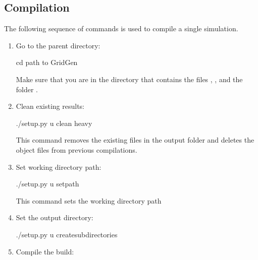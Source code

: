\documentclass[letterpaper,10pt,english]{sphinxmanual}
\begin{document}
\subsection{Compilation}
\label{\detokenize{setup:compilation}}\label{\detokenize{setup:id2}}
The following sequence of commands is used to compile a single simulation.
\begin{enumerate}
\item {} 
Go to the parent directory:

\begin{sphinxVerbatim}[commandchars=\\\{\}]
\PYGZdl{} cd \PYGZlt{}path to \textbar{}GridGen\textbar{}\PYGZgt{}
\end{sphinxVerbatim}

Make sure that you are in the directory that contains the files , , and the folder .

\item {} 
Clean existing results:

\begin{sphinxVerbatim}[commandchars=\\\{\}]
\PYGZdl{} ./setup.py \PYGZhy{}u clean heavy
\end{sphinxVerbatim}

This command removes the existing files in the output folder  and deletes the object files from previous compilations. 

\item {} 
Set working directory path:

\begin{sphinxVerbatim}[commandchars=\\\{\}]
\PYGZdl{} ./setup.py \PYGZhy{}u set\PYGZus{}path
\end{sphinxVerbatim}

This command sets the working directory path

\item {} 
Set the output directory:

\begin{sphinxVerbatim}[commandchars=\\\{\}]
\PYGZdl{} ./setup.py \PYGZhy{}u create\PYGZus{}subdirectories
\end{sphinxVerbatim}

\item {} 
Compile the build:


\end{enumerate}
\end{document}
